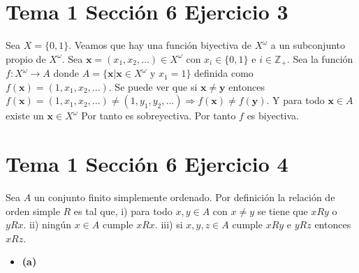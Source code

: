 \documentclass{article}
\newcommand{\vect}[1]{\boldsymbol{#1}}
\begin{document}
\section{Tema 1 Sección 6 Ejercicio 3}
Sea $X=\{0,1\}$. Veamos que hay una función biyectiva de  $X^{\omega}$ a un subconjunto propio de $X^{\omega}$. Sea $\vect{x}=(x_1,x_2,...)\in X^{\omega}$ con $x_i\in\{0,1\}$ e $i\in \mathbb{Z}_{+}$. Sea   la función  $f:X^{\omega}\rightarrow A$ donde $A=\{\vect{x}|\vect{x}\in X^{\omega}\text{ y }x_1=1\}$ definida como $f(\vect{x})=(1,x_1,x_2,...)$. Se puede ver que si $\vect{x}\neq \vect{y}$ entonces $f(\vect{x})=(1,x_1,x_2,...)\neq (1,y_1,y_2,...)\Rightarrow f(\vect{x})\neq f(\vect{y})$. Y para todo $\vect{x}\in A$ existe un $\vect{x}\in X^{\omega} $ Por tanto es sobreyectiva. Por tanto $f$ es biyectiva.
\section{Tema 1 Sección 6 Ejercicio 4}

Sea $A$ un conjunto finito simplemente ordenado. Por definición la relación de orden simple $R$ es tal que, i) para todo $x,y\in A$ con $x\neq y$ se tiene que $xRy$ o $yRx$. ii) ningún $x\in A$ cumple $xRx$. iii) si $x,y,z\in A$ cumple $xRy$ e $yRz$ entonces $xRz$.
\begin{itemize}
\item \bf (a) \rm
\end{itemize}
\end{document}
